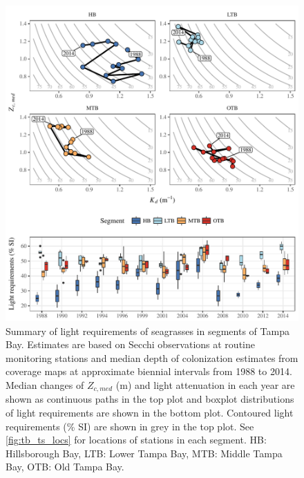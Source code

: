 \documentclass[letterpaper,12pt,oneside]{article}\usepackage[]{graphicx}\usepackage[]{color}
\newcommand{\beginsupplement}{%
        \setcounter{table}{0}
        \renewcommand{\thetable}{S\arabic{table}}%
        \setcounter{figure}{0}
        \renewcommand{\thefigure}{S\arabic{figure}}%
     }
\begin{document}
\begin{figure}
\centering
\includegraphics[width = \textwidth]{figs/Fig10.pdf}
\caption{Summary of light requirements of seagrasses in segments of Tampa Bay. Estimates are based on Secchi observations at routine monitoring stations and median depth of colonization estimates from coverage maps at approximate biennial intervals from 1988 to 2014. Median changes of $Z_{c, med}$ (m) and light attenuation in each year are shown as continuous paths in the top plot and boxplot distributions of light requirements are shown in the bottom plot. Contoured light requirements (\% SI) are shown in grey in the top plot. See \cref{fig:tb_ts_locs} for locations of stations in each segment. HB: Hillsborough Bay, LTB: Lower Tampa Bay, MTB: Middle Tampa Bay, OTB: Old Tampa Bay.}
\label{fig:tb_ts}
\end{figure}
\clearpage

\beginsupplement

\end{document}
